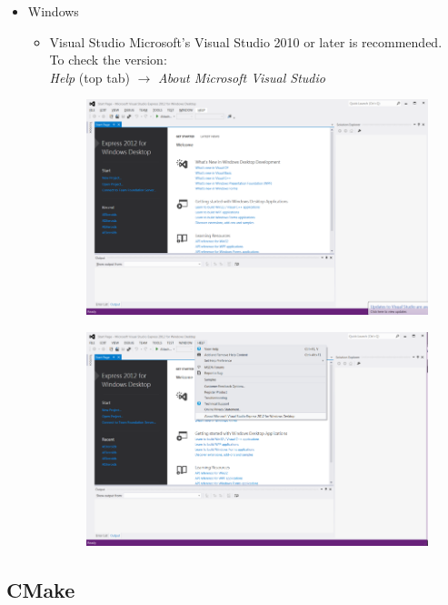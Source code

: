 \begin{itemize}
	\item Windows
	\begin{itemize}
	\item Visual Studio
		Microsoft's Visual Studio 2010 or later is recommended.\\
		To check the version:\\
		\textit{Help} (top tab) $\to$ \textit{About Microsoft Visual Studio}
		\begin{figure}[H]
			\centering
			\includegraphics[scale=0.6]{images/vshelp}
			\end{figure}
			\begin{figure}[H]
			\centering
			\includegraphics[scale=0.6]{images/vsabout}
		\end{figure}
	\end{itemize}
\end{itemize}
\subsection{CMake}


